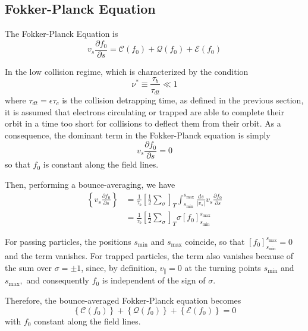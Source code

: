 
\label{lowcollision}

\subsection{Fokker-Planck Equation}

The Fokker-Planck Equation is
\begin{equation}
v_{s}\frac{\partial f_{0}}{\partial s}=\mathcal{C}\left(  f_{0}\right)
+\mathcal{Q}\left(  f_{0}\right)  +\mathcal{E}\left(  f_{0}\right)
\end{equation}

In the low collision regime, which is characterized by the condition
\begin{equation}
\nu^{*}\equiv\frac{\tau_{b}}{\tau_{dt}}\ll1
\end{equation}
where $\tau_{dt}=\epsilon\tau_{c}$ is the collision detrapping time, as
defined in the previous section, it is assumed that electrons circulating or
trapped are able to complete their orbit in a time too short for collisions to
deflect them from their orbit. As a consequence, the dominant term in the
Fokker-Planck equation is simply
\begin{equation}
v_{s}\frac{\partial f_{0}}{\partial s}=0
\end{equation}
so that $f_{0}$ is constant along the field lines.

Then, performing a bounce-averaging, we have
\begin{align}
\left\{  v_{s}\frac{\partial f_{0}}{\partial s}\right\}   & =\frac{1}{\tau
_{b}}\left[  \frac{1}{2}\sum_{\sigma}\right]  _{T}\int_{s_{\min}}^{s_{\max}%
}\frac{ds}{\left|  v_{s}\right|  }v_{s}\frac{\partial f_{0}}{\partial
s}\nonumber\\
& =\frac{1}{\tau_{b}}\left[  \frac{1}{2}\sum_{\sigma}\right]  _{T}%
\sigma\left[  f_{0}\right]  _{s_{\min}}^{s_{\max}}\label{dsbav}%
\end{align}

For passing particles, the positions $s_{\min}$ and $s_{\max}$ coincide, so
that $\left[  f_{0}\right]  _{s_{\min}}^{s_{\max}}=0$ and the term vanishes.
For trapped particles, the term also vanishes because of the sum over
$\sigma=\pm1$, since, by definition, $v_{\Vert}=0$ at the turning points
$s_{\min}$ and $s_{\max},$ and consequently $f_{0}$ is independent of the sign
of $\sigma.$

Therefore, the bounce-averaged Fokker-Planck equation becomes
\begin{equation}
\left\{  \mathcal{C}\left(  f_{0}\right)  \right\}  +\left\{  \mathcal{Q}%
\left(  f_{0}\right)  \right\}  +\left\{  \mathcal{E}\left(  f_{0}\right)
\right\}  =0\label{FPeqdef}%
\end{equation}
with $f_{0}$ constant along the field lines.

